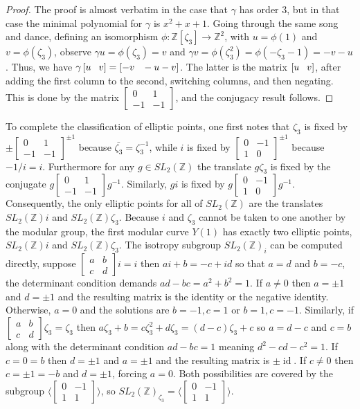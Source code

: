 \documentclass[18pt]{amsart}
\newcommand{\Z}{\mathbb{Z}}
\newcommand{\tbt}[4]{\left[ \begin{smallmatrix}
		#1 & #2 \\
		#3 & #4 
	\end{smallmatrix} \right] }
\newcommand{\id}{\operatorname{id}}
\begin{document}
\begin{proof}
		The proof is almost verbatim in the case that $\gamma$ has order $3$, but in that case the minimal polynomial for $\gamma$ is $x^2+x+1$. Going through the same song and dance, defining an isomorphism $\phi: \Z[\zeta_3]\to \Z^2$, with $u=\phi(1)$ and $v=\phi(\zeta_3)$, observe $\gamma u =\phi(\zeta_3)=v$ and $\gamma v=\phi(\zeta_3 ^2)=\phi(-\zeta_3-1)=-v-u$. Thus, we have $\gamma \left[ u \hspace{8 pt} v\right] = \left[ -v \hspace{8 pt} -u-v\right]$. The latter is the matrix $\left[ u \hspace{8 pt} v\right]$, after adding the first column to the second, switching columns, and then negating. This is done by the matrix $\tbt{0}{1}{-1}{-1}$, and the conjugacy result follows.
	\end{proof}
	To complete the classification of elliptic points, one first notes that $\zeta_3$ is fixed by $\pm \tbt{0}{1}{-1}{-1}^{\pm 1}$ because $\bar{\zeta_3}=\zeta_{3}^{-1}$, while $i$ is fixed by  $\tbt{0}{-1}{1}{0}^{\pm 1}$ because $-1/i=i$. Furthermore for any $g\in SL_2(\Z)$ the translate $g\zeta_3$ is fixed by the conjugate $g\tbt{0}{1}{-1}{-1}g^{-1}$. Similarly, $g i$ is fixed by $g \tbt{0}{-1}{1}{0} g^{-1}$. Consequently, the only elliptic points for all of $SL_2(\Z)$ are the translates $SL_2(\Z) i$ and $SL_2(\Z) \zeta_3$. Because $i$ and $\zeta_3$ cannot be taken to one another by the modular group, the first modular curve $Y(1)$ has exactly two elliptic points, $SL_2(\Z) i$ and $SL_2(\Z) \zeta_3$.
	The isotropy subgroup $SL_2(\Z)_i$ can be computed directly, suppose $\tbt{a}{b}{c}{d} i=i$ then $ai+b=-c+id$ so that $a=d$ and $b=-c$, the determinant condition demands $ad-bc=a^2+b^2=1$. If $a\neq0$ then $a=\pm1$ and $d=\pm1$ and the resulting matrix is the identity or the negative identity. Otherwise, $a=0$ and the solutions are $b=-1, c=1$ or $b=1,c=-1$. Similarly, if $\tbt{a}{b}{c}{d} \zeta_3=\zeta_3$ then $a\zeta_3+b=c\zeta_{3}^2+d\zeta_3=(d-c)\zeta_3+c$ so $a=d-c$ and $c=b$ along with the determinant condition $ad-bc=1$ meaning $d^2-cd-c^2=1$. If $c=0=b$ then $d=\pm1$ and $a=\pm1$ and the resulting matrix is $\pm \id$. If $c\neq 0$ then $c=\pm1=-b$ and $d=\pm1$, forcing $a=0$. Both possibilities are covered by the subgroup $\langle \tbt{0}{-1}{1}{1}\rangle$, so $SL_2(\Z)_{\zeta_3}=\langle \tbt{0}{-1}{1}{1}\rangle$.
\end{document}
